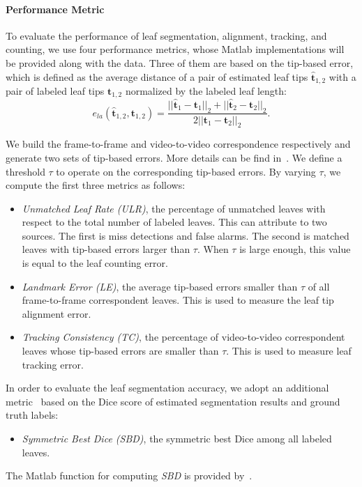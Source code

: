 \paragraph{Performance Metric}
To evaluate the performance of leaf segmentation, alignment, tracking, and counting, we use four performance metrics, whose Matlab implementations will be provided along with the data.
Three of them are based on the tip-based error, which is defined as the average distance of a pair of estimated leaf tips $\hat{\bm{t}}_{1,2}$ with a pair of labeled leaf tips $ \bm{t}_{1,2}$ normalized by the labeled leaf length:
\begin {equation}
e_{la}(\hat{\bm{t}}_{1,2}, \bm{t}_{1,2}) = \frac{||\hat{\bm{t}}_1-{\bm{t}}_1||_2 + ||\hat{\bm{t}}_2-{\bm{t}}_2||_2}{2 ||\bm{t}_1-\bm{t}_2||_2}.
\label{eqn:tipError}
\end{equation}

We build the frame-to-frame and video-to-video correspondence respectively and generate two sets of tip-based errors.
More details can be find in~\cite{yin2015}.
We define a threshold $\tau$ to operate on the corresponding tip-based errors.
By varying $\tau$, we compute the first three metrics as follows:
\begin{itemize}
\item {\it{Unmatched Leaf Rate (ULR)}}, the percentage of unmatched leaves with respect to the total number of labeled leaves.
This can attribute to two sources.
The first is miss detections and false alarms.
The second is matched leaves with tip-based errors larger than $\tau$.
When $\tau$ is large enough, this value is equal to the leaf counting error.
\item {\it{Landmark Error (LE)}}, the average tip-based errors smaller than $\tau$ of all frame-to-frame correspondent leaves.
This is used to measure the leaf tip alignment error.
\item {\it{Tracking Consistency (TC)}}, the percentage of video-to-video correspondent leaves whose tip-based errors are smaller than $\tau$.
This is used to measure leaf tracking error.
\end{itemize}

In order to evaluate the leaf segmentation accuracy, we adopt an additional metric~\cite{scharr2014annotated} based on the Dice score of estimated segmentation results and ground truth labels:
\begin{itemize}
\item {\it{Symmetric Best Dice (SBD)}}, the symmetric best Dice among all labeled leaves.
\end{itemize}
The Matlab function for computing {\it{SBD}} is provided by~\cite{scharr2014annotated}.


